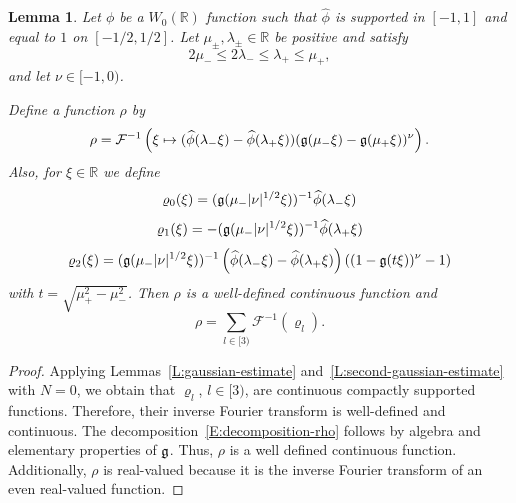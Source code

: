 \documentclass[12pt,reqno]{amsart}
\theoremstyle{plain}
\newtheorem{lemma}[theorem]{Lemma}
\numberwithin{equation}{section}
\theoremstyle{remark}
\newcommand{\uses}[1]{}
\newcommand{\usesdefs}[1]{}
\newcommand{\R}{{\mathbb R}}
\begin{document}
\begin{lemma}\label{L:gaussian-bump-decomposition}\uses{L:gaussian-estimate,L:second-gaussian-estimate}\usesdefs{gaussian,auto:Wiener-space-definition}
Let $\phi$ be a $W_0(\R)$ function such that
$\widehat{\phi}$ is supported in $[-1,1]$ and equal to $1$ on $[-1/2,1/2]$.
Let $\mu_\pm,\lambda_\pm\in\mathbb R$ be positive and satisfy
\begin{equation}\label{E:assumption-on-mu-lambda}
2\mu_-\le 2\lambda_-\le \lambda_+\le \mu_+,
\end{equation}
and let $\nu\in [-1,0)$.

Define a function $\rho$ by
\begin{equation}\label{E:definition-rho}
\rho = \mathcal F^{-1}\left(\xi \mapsto (\widehat{\phi}(\lambda_-\xi) - \widehat{\phi}(\lambda_+\xi)) (\mathfrak{g}(\mu_- \xi)-\mathfrak{g}(\mu_+\xi))^{\nu}\right).
\end{equation}
Also, for $\xi \in \R$ we define
\begin{equation}\label{auto:four-scale-Gaussian-first-multiplier}
    \varrho_0(\xi)=(\mathfrak{g}(\mu_{-}|\nu|^{1/2}\xi))^{-1}\widehat{\phi}(\lambda_{-}\xi)
\end{equation}
\begin{equation}\label{auto:four-scale-Gaussian-second-multiplier}
    \varrho_1(\xi)=-(\mathfrak{g}(\mu_{-}|\nu|^{1/2}\xi))^{-1}\widehat{\phi}(\lambda_{+}\xi)
\end{equation}
\begin{equation}\label{auto:four-scale-Gaussian-remainder-multiplier}
    \varrho_2(\xi)=(\mathfrak{g}(\mu_{-}|\nu|^{1/2}\xi))^{-1}\left(\widehat{\phi}(\lambda_{-}\xi)-\widehat{\phi}(\lambda_{+}\xi)\right)\left((1-\mathfrak{g}(t\xi))^{\nu} -1\right)
\end{equation}
with $t=\sqrt{\mu_{+}^2-\mu_{-}^2}$.
Then $\rho$ is a well-defined continuous function and
\begin{equation}\label{E:decomposition-rho}
\rho=\sum_{l\in [3)} \mathcal F^{-1} (\varrho_l).
\end{equation}
\end{lemma}

\begin{proof}
Applying Lemmas~\ref{L:gaussian-estimate} and~\ref{L:second-gaussian-estimate} with $N=0$, we obtain that $\varrho_l$, $l\in [3)$, are continuous compactly supported functions. Therefore, their inverse Fourier transform is well-defined and continuous. The decomposition~\eqref{E:decomposition-rho} follows by algebra and elementary properties of $\mathfrak{g}$. Thus, $\rho$ is a well defined continuous function.
Additionally, $\rho$ is real-valued because it is the inverse Fourier transform of an even real-valued function.
\end{proof}
\end{document}
